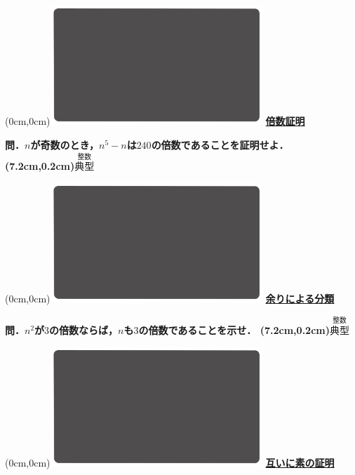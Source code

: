 \documentclass[10pt,
fleqn,
dvipdfmx,
uplatex
]{jsarticle}
\begin{document}
\at(0cm,0cm){\includegraphics[width=8cm,bb=0 0 1920 1080]{./youtube/thumbnails/templates/smart_background/整数.jpeg}}
{\color{orange}\bf\boldmath\huge\underline{倍数証明}}\vspace{0.3zw}

\huge 
\bf\boldmath 問．$n$が奇数のとき，$n^5-n$は${240}$の倍数であることを証明せよ．
\at(7.2cm,0.2cm){\small\color{bradorange}$\overset{\text{整数}}{\text{典型}}$}


\newpage



\at(0cm,0cm){\includegraphics[width=8cm,bb=0 0 1920 1080]{./youtube/thumbnails/templates/smart_background/整数.jpeg}}
{\color{orange}\bf\boldmath\huge\underline{余りによる分類}}\vspace{0.3zw}

\LARGE 
\bf\boldmath 問．$n^2$が$3$の倍数ならば，$n$も$3$の倍数であることを示せ．
\at(7.2cm,0.2cm){\small\color{bradorange}$\overset{\text{整数}}{\text{典型}}$}


\newpage



\at(0cm,0cm){\includegraphics[width=8cm,bb=0 0 1920 1080]{./youtube/thumbnails/templates/smart_background/整数.jpeg}}
{\color{orange}\bf\boldmath\huge\underline{互いに素の証明}}\vspace{0.3zw}
\end{document}
